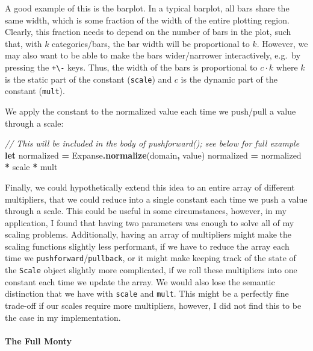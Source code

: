 \documentclass[
]{book}
\newenvironment{Shaded}{\begin{snugshade}}{\end{snugshade}}
\newcommand{\CommentTok}[1]{\textcolor[rgb]{0.56,0.35,0.01}{\textit{#1}}}
\newcommand{\FunctionTok}[1]{\textcolor[rgb]{0.13,0.29,0.53}{\textbf{#1}}}
\newcommand{\KeywordTok}[1]{\textcolor[rgb]{0.13,0.29,0.53}{\textbf{#1}}}
\newcommand{\NormalTok}[1]{#1}
\newcommand{\OperatorTok}[1]{\textcolor[rgb]{0.81,0.36,0.00}{\textbf{#1}}}
\theoremstyle{definition}
\theoremstyle{definition}
\theoremstyle{definition}
\theoremstyle{definition}
\theoremstyle{remark}
\begin{document}
A good example of this is the barplot. In a typical barplot, all bars share the same width, which is some fraction of the width of the entire plotting region. Clearly, this fraction needs to depend on the number of bars in the plot, such that, with \(k\) categories/bars, the bar width will be proportional to \(k\). However, we may also want to be able to make the bars wider/narrower interactively, e.g.~by pressing the \texttt{+\textbackslash{}-} keys. Thus, the width of the bars is proportional to \(c \cdot k\) where \(k\) is the static part of the constant (\texttt{scale}) and \(c\) is the dynamic part of the constant (\texttt{mult}).

We apply the constant to the normalized value each time we push/pull a value through a scale:

\begin{Shaded}
\begin{Highlighting}[]
\CommentTok{// This will be included in the body of pushforward(); see below for full example}
\KeywordTok{let}\NormalTok{ normalized }\OperatorTok{=}\NormalTok{ Expanse}\OperatorTok{.}\FunctionTok{normalize}\NormalTok{(domain}\OperatorTok{,}\NormalTok{ value)}
\NormalTok{normalized }\OperatorTok{=}\NormalTok{ normalized }\OperatorTok{*}\NormalTok{ scale }\OperatorTok{*}\NormalTok{ mult}
\end{Highlighting}
\end{Shaded}

Finally, we could hypothetically extend this idea to an entire array of different multipliers, that we could reduce into a single constant each time we push a value through a scale. This could be useful in some circumstances, however, in my application, I found that having two parameters was enough to solve all of my scaling problems. Additionally, having an array of multipliers might make the scaling functions slightly less performant, if we have to reduce the array each time we \texttt{pushforward}/\texttt{pullback}, or it might make keeping track of the state of the \texttt{Scale} object slightly more complicated, if we roll these multipliers into one constant each time we update the array. We would also lose the semantic distinction that we have with \texttt{scale} and \texttt{mult}. This might be a perfectly fine trade-off if our scales require more multipliers, however, I did not find this to be the case in my implementation.

\paragraph{The Full Monty}\label{the-full-monty}
\end{document}
